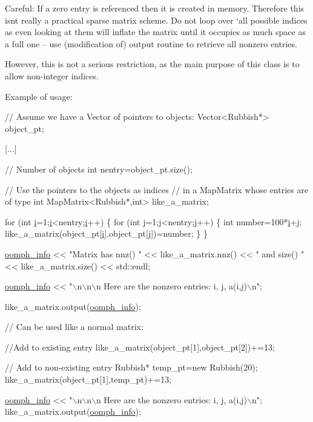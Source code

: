 Careful\+: If a zero entry is referenced then it is created in memory. Therefore this isn\textquotesingle{}t really a practical sparse matrix scheme. Do not loop over `all\textquotesingle{} possible indices as even looking at them will inflate the matrix until it occupies as much space as a full one -- use (modification of) output routine to retrieve all nonzero entries.

However, this is not a serious restriction, as the main purpose of this class is to allow non-\/integer indices.

Example of usage\+: 
\begin{DoxyCode}
 \textcolor{comment}{// Assume we have a Vector of pointers to objects:}
 Vector<Rubbish*> object\_pt;
 
 [...]

 \textcolor{comment}{// Number of objects}
 \textcolor{keywordtype}{int} nentry=object\_pt.size();

 \textcolor{comment}{// Use the pointers to the objects as indices }
 \textcolor{comment}{// in a MapMatrix whose entries are of type int}
 MapMatrix<Rubbish*,int> like\_a\_matrix;

 \textcolor{keywordflow}{for} (\textcolor{keywordtype}{int} \hyperlink{cfortran_8h_adb50e893b86b3e55e751a42eab3cba82}{i}=1;\hyperlink{cfortran_8h_adb50e893b86b3e55e751a42eab3cba82}{i}<nentry;\hyperlink{cfortran_8h_adb50e893b86b3e55e751a42eab3cba82}{i}++)
  \{
   \textcolor{keywordflow}{for} (\textcolor{keywordtype}{int} j=1;j<nentry;j++)
    \{
     \textcolor{keywordtype}{int} number=100*\hyperlink{cfortran_8h_adb50e893b86b3e55e751a42eab3cba82}{i}+j;
     like\_a\_matrix(object\_pt[\hyperlink{cfortran_8h_adb50e893b86b3e55e751a42eab3cba82}{i}],object\_pt[j])=number;
    \}
  \}

 \hyperlink{namespaceoomph_aec474227917784dc0a255faf289cfc16}{oomph\_info} << \textcolor{stringliteral}{"Matrix has nnz() "} << like\_a\_matrix.nnz() << 
         \textcolor{stringliteral}{" and size() "} << like\_a\_matrix.size() << std::endl; 

 \hyperlink{namespaceoomph_aec474227917784dc0a255faf289cfc16}{oomph\_info} << \textcolor{stringliteral}{"\(\backslash\)n\(\backslash\)n\(\backslash\)n Here are the nonzero entries: i, j, a(i,j)\(\backslash\)n"};

 like\_a\_matrix.output(\hyperlink{namespaceoomph_aec474227917784dc0a255faf289cfc16}{oomph\_info});

 \textcolor{comment}{// Can be used like a normal matrix:}

 \textcolor{comment}{//Add to existing entry}
 like\_a\_matrix(object\_pt[1],object\_pt[2])+=13;
 
 \textcolor{comment}{// Add to non-existing entry}
 Rubbish* temp\_pt=\textcolor{keyword}{new} Rubbish(20);
 like\_a\_matrix(object\_pt[1],temp\_pt)+=13;

 \hyperlink{namespaceoomph_aec474227917784dc0a255faf289cfc16}{oomph\_info} << \textcolor{stringliteral}{"\(\backslash\)n\(\backslash\)n\(\backslash\)n Here are the nonzero entries: i, j, a(i,j)\(\backslash\)n"};
like\_a\_matrix.output(\hyperlink{namespaceoomph_aec474227917784dc0a255faf289cfc16}{oomph\_info});
\end{DoxyCode}
 

